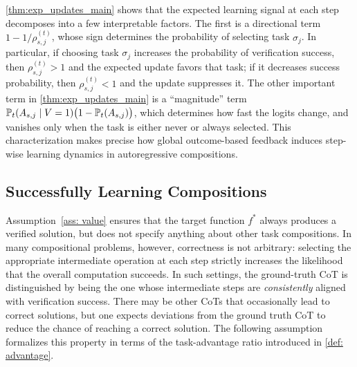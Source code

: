 \documentclass{article}
\theoremstyle{plain}
\theoremstyle{definition}
\theoremstyle{remark}
\begin{document}
\cref{thm:exp_updates_main} shows that the expected learning signal at each step decomposes into a few interpretable factors. The first is a directional term $1-1/\rho^{(t)}_{s,j}$, whose sign determines the probability of selecting task $\sigma_j$. In particular, if choosing task $\sigma_j$ increases the probability of verification success, then $\rho^{(t)}_{s,j}>1$ and the expected update favors that task; if it decreases success probability, then $\rho^{(t)}_{s,j}<1$ and the update suppresses it. The other important term in \cref{thm:exp_updates_main} is a ``magnitude'' term $\P_t(A_{s,j}\mid V=1)\bigl(1-\P_t(A_{s,j})\bigr)$, which determines how fast the logits change, and vanishes only when the task is either never or always selected. This characterization makes precise how global outcome-based feedback induces step-wise learning dynamics in autoregressive compositions.


\subsection{Successfully Learning Compositions}

Assumption~\ref{ass: value} ensures that the target function $f^*$ always produces a verified solution, but does not specify anything about other task compositions. In many compositional problems, however, correctness is not arbitrary: selecting the appropriate intermediate operation at each step strictly increases the likelihood that the overall computation succeeds. In such settings, the ground-truth CoT is distinguished by being the one whose intermediate steps are \emph{consistently} aligned with verification success. There may be other CoTs that occasionally lead to correct solutions, but one expects deviations from the ground truth CoT to reduce the chance of reaching a correct solution. The following assumption formalizes this property in terms of the task-advantage ratio introduced in \cref{def: advantage}.
\end{document}
